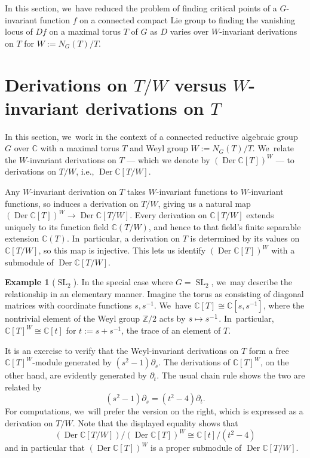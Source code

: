 \documentclass[JEP,XML,SOM,Unicode,NoFloatCountersInSection,published]{cedram}
\newcommand\mto{\mathchoice{\longmapsto}{\mapsto}{\mapsto}{\mapsto}}
\theoremstyle{definition}
\newtheorem{example}[equation]{Example}
\newcommand{\C}{\mathbb{C}}
\newcommand{\Z}{\mathbb{Z}}
\DeclareMathOperator{\SL}{SL}
\DeclareMathOperator{\Der}{Der}
\begin{document}
In this section, we~have reduced the problem of finding critical points of a $G$-invariant function $f$ on a connected compact Lie group to finding the vanishing locus of $Df$ on a maximal torus $T$ of $G$ as $D$ varies over $W$-invariant derivations on $T$ for $W := N_G(T)/T$.

\section{Derivations on \texorpdfstring{$T/W$}{T/W} versus \texorpdfstring{$W$}{W}-invariant derivations on \texorpdfstring{$T$}{T}} \label{Wders.2}

In this section, we~work in the context of a connected reductive algebraic
group~$G$ over $\C$ with a maximal torus $T$ and Weyl group $W := N_G(T)/T$. We~relate the $W$-invariant derivations on $T$ --- which we denote by $(\Der \C[T])^W$ --- to derivations on $T/W$, i.e., $\Der \C[T/W]$.

Any $W$-invariant derivation on $T$ takes $W$-invariant functions to
$W$-invariant functions, so induces a derivation on $T/W$, giving us a
natural map $(\Der \C[T])^W\to \Der \C[T/W]$. Every derivation on $\C[T/W]$ extends uniquely to its function field
$\C(T/W)$, and hence to that field's finite separable extension $\C(T)$. In~particular, a derivation on $T$ is determined by its values on $\C[T/W]$,
so this map is injective. This lets us identify $(\Der \C[T])^W$ with a
submodule of $\Der \C[T/W]$.

\begin{example}[$\SL_2$] \label{A1.eg}
In the special case where $G = \SL_2$, we~may describe the relationship in an elementary manner. Imagine the torus as consisting of diagonal matrices with coordinate functions $s, s^{-1}$. We~have $\C[T] \cong \C[s, s^{-1}]$, where the nontrivial element of the Weyl group $\Z/2$ acts by $s \mto s^{-1}$. In~particular, $\C[T]^W \cong \C[t]$ for $t := s + s^{-1}$, the trace of an element of $T$.

It is an exercise to verify that the Weyl-invariant derivations on $T$ form a free $\C[T]^W$-module generated by $(s^2 - 1) \partial_s$. The derivations of $\C[T]^W$, on the other hand, are evidently generated by $\partial_t$. The usual chain rule shows the two are related by
\[
(s^2 - 1) \partial_s = (t^2 - 4) \partial_t.
\]
For computations, we~will prefer the version on the right, which is expressed as a derivation on $T/W$. Note that the displayed equality shows that
\[
(\Der \C[T/W]) / (\Der \C[T])^W \cong \C[t]/(t^2 - 4)
\]
and in particular that $(\Der \C[T])^W$ is a proper submodule of $\Der \C[T/W]$.
\end{example}
\end{document}
